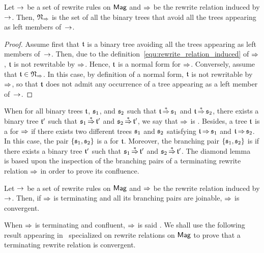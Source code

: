 \begin{Lemma} \label{lem:normal_forms_avoiding}
    Let $\operatorname{\to}$ be a set of rewrite rules on $\mathsf{Mag}$ and $\operatorname{\Rightarrow}$ be
    the rewrite relation induced by $\operatorname{\to}$. Then,
    $\mathfrak{N}_{\operatorname{\Rightarrow}}$ is the set of all the binary trees that
    avoid all the trees appearing as left members of~$\operatorname{\to}$.
\end{Lemma}
\begin{proof}
    Assume first that $\mathfrak{t}$ is a binary tree avoiding all the trees
    appearing as left members of~$\operatorname{\to}$. Then, due to the
    definition~\eqref{equ:rewrite_relation_induced} of $\operatorname{\Rightarrow}$,
    $\mathfrak{t}$ is not rewritable by $\operatorname{\Rightarrow}$. Hence, $\mathfrak{t}$ is a normal
    form for $\operatorname{\Rightarrow}$. Conversely, assume that
    $\mathfrak{t} \in \mathfrak{N}_{\operatorname{\Rightarrow}}$. In this case, by definition
    of a normal form, $\mathfrak{t}$ is not rewritable by $\operatorname{\Rightarrow}$, so that
    $\mathfrak{t}$ does not admit any occurrence of a tree appearing as a left
    member of~$\operatorname{\to}$.
\end{proof}
\medbreak

When for all binary trees $\mathfrak{t}$, $\mathfrak{s}_1$, and $\mathfrak{s}_2$ such that
$\mathfrak{t} \operatorname{\overset{\ast}{\operatorname{\Rightarrow}}} \mathfrak{s}_1$ and $\mathfrak{t} \operatorname{\overset{\ast}{\operatorname{\Rightarrow}}} \mathfrak{s}_2$, there
exists a binary tree $\mathfrak{t}'$ such that $\mathfrak{s}_1 \operatorname{\overset{\ast}{\operatorname{\Rightarrow}}} \mathfrak{t}'$ and
$\mathfrak{s}_2 \operatorname{\overset{\ast}{\operatorname{\Rightarrow}}} \mathfrak{t}'$, we say that $\operatorname{\Rightarrow}$ is
. Besides, a tree $\mathfrak{t}$ is a  for
$\operatorname{\Rightarrow}$ if there exists two different trees $\mathfrak{s}_1$ and $\mathfrak{s}_2$
satisfying $\mathfrak{t} \operatorname{\Rightarrow} \mathfrak{s}_1$ and $\mathfrak{t} \operatorname{\Rightarrow} \mathfrak{s}_2$. In
this case, the pair $\{\mathfrak{s}_1, \mathfrak{s}_2\}$ is a  for
$\mathfrak{t}$. Moreover, the branching pair $\{\mathfrak{s}_1, \mathfrak{s}_2\}$ is
 if there exists a binary tree $\mathfrak{t}'$ such that
$\mathfrak{s}_1 \operatorname{\overset{\ast}{\operatorname{\Rightarrow}}} \mathfrak{t}'$ and $\mathfrak{s}_2 \operatorname{\overset{\ast}{\operatorname{\Rightarrow}}} \mathfrak{t}'$. The
diamond lemma~\cite{New42} is based upon the inspection of the branching
pairs of a terminating rewrite relation $\operatorname{\Rightarrow}$ in order to prove
its confluence.
\medbreak

\begin{Lemma} \label{lem:diamond_lemma}
    Let $\operatorname{\to}$ be a set of rewrite rules on $\mathsf{Mag}$ and $\operatorname{\Rightarrow}$ be
    the rewrite relation induced by $\operatorname{\to}$. Then, if $\operatorname{\Rightarrow}$ is
    terminating and all its branching pairs are joinable, $\operatorname{\Rightarrow}$
    is convergent.
\end{Lemma}
\medbreak

When $\operatorname{\Rightarrow}$ is terminating and confluent, $\operatorname{\Rightarrow}$ is said
. We shall use the following result appearing
in~\cite{Gir16} specialized on rewrite relations on $\mathsf{Mag}$ to prove that
a terminating rewrite relation is convergent.
\medbreak

